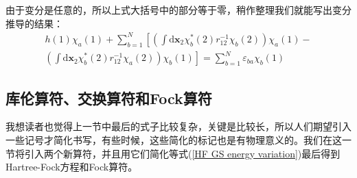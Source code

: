 \documentclass[12pt,a4paper,openany,twoside]{book}
\numberwithin{equation}{section}
\begin{document}
          由于变分是任意的，所以上式大括号中的部分等于零，稍作整理我们就能写出变分推导的结果：
          \begin{equation}
            \begin{aligned}
              h(1) \chi_{a}(1)+\sum_{b=1}^{N}\left[\left(\int \mathrm{d} \mathbf{x}_{2} \chi_{b}^{*}(2) r_{12}^{-1} \chi_{b}(2)\right) \chi_{a}(1)-\right. \\ 
              \left. \left(\int \mathrm{d} \mathbf{x}_{2} \chi_{b}^{*}(2) r_{12}^{-1} \chi_{a}(2)\right) \chi_{b}(1)\right] =\sum_{b=1}^{N} \varepsilon_{b a} \chi_{b}(1)
            \end{aligned}
            \label{HF GS energy variation}
          \end{equation}
        \subsection{库伦算符、交换算符和Fock算符}
          我想读者也觉得上一节中最后的式子比较复杂，关键是比较长，所以人们期望引入一些记号才简化书写，有些时候，这些简化的标记也是有物理意义的。我们在这一节将引入两个新算符，并且用它们简化等式(\ref{HF GS energy variation})最后得到Hartree-Fock方程和Fock算符。
          
\end{document}
